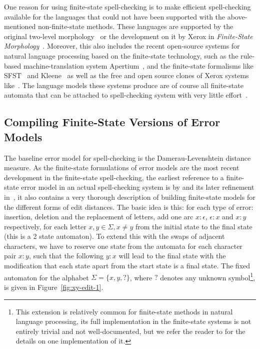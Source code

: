 \documentclass[a4paper,12pt]{article}
\begin{document}
One reason for using finite-state spell-checking is to make efficient
spell-checking available for the languages that could not have been supported
with the above-mentioned non-finite-state methods. These languages are
supported by the original two-level morphology~\cite[]{koskenniemi/1983} or the
development on it by Xerox in \emph{Finite-State
Morphology}~\cite[]{beesley2003finite}.  Moreover, this also includes the
recent open-source systems for natural language processing based on the
finite-state technology, such as the rule-based machine-translation system
Apertium~\cite[]{apertium2010}, and the finite-state formalisms like
SFST~\cite[]{schmid2006programming} and Kleene~\cite[]{beesley2012kleene} as
well as the free and open source clones of Xerox systems
like~\cite{hfst/2012/cla,hulden2009foma}.  The language models these systems
produce are of course all finite-state automata that can be attached to
spell-checking system with very little
effort~\cite[e.g.][]{pirinen2012compiling}.

\subsection{Compiling Finite-State Versions of Error Models}
\label{subsec:error-models}

The baseline error model for spell-checking is the Damerau-Levenshtein distance
measure. As the finite-state formulations of error models are the most recent
development in the finite-state spell-checking, the earliest reference to a
finite-state error model in an actual spell-checking system is by
\cite{schulz/2002} and its later refinement in~\cite{schulz2004fast}, it also
contains a very thorough description of building finite-state models for the
different forms of edit distances. The basic idea is this: for each type of
error: insertion, deletion and the replacement of letters, add one arc
$x:\epsilon$, $\epsilon:x$ and $x:y$ respectively, for each letter $x, y \in
\Sigma, x \neq y$ from the initial state to the final state (this is a 2 state
automaton). To extend this with the swaps of adjacent characters, we have to
reserve one state from the automata for each character pair $x:y$, such that
the following $y:x$ will lead to the final state \cite[]{pirinen/2010/lrec}
with the modification that each state apart from the start state is a final
state.  The fixed automaton for the alphabet $\Sigma = \{x, y, ?\}$, where $?$
denotes any unknown symbol\footnote{This extension is relatively common for
    finite-state methods in natural language processing, its full
    implementation in the finite-state systems is not entirely trivial and not
    well-documented, but we refer the reader to \cite[]{beesley2003finite} for
the details on one implementation of it.}, is given in
Figure~\ref{fig:xy-edit-1}.
\end{document}
